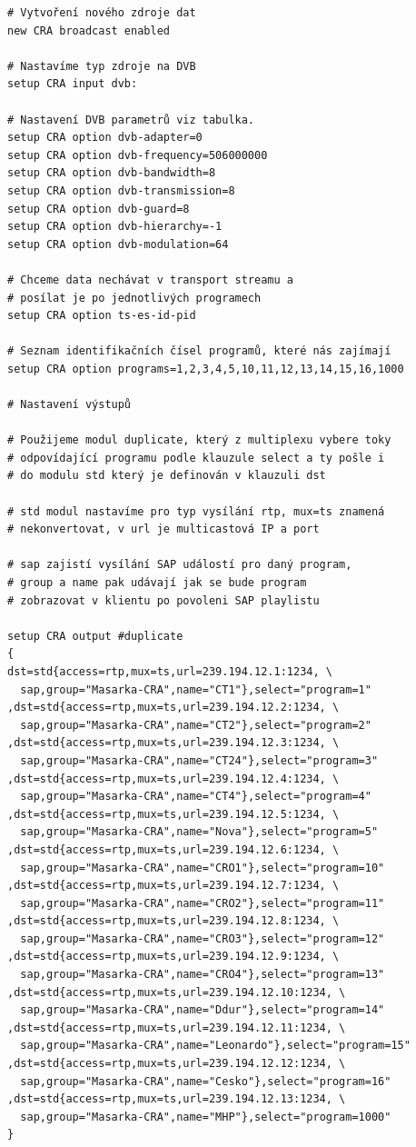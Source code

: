 \begin{small}
\begin{verbatim}
# Vytvoření nového zdroje dat
new CRA broadcast enabled

# Nastavíme typ zdroje na DVB
setup CRA input dvb:

# Nastavení DVB parametrů viz tabulka.
setup CRA option dvb-adapter=0
setup CRA option dvb-frequency=506000000
setup CRA option dvb-bandwidth=8
setup CRA option dvb-transmission=8
setup CRA option dvb-guard=8
setup CRA option dvb-hierarchy=-1
setup CRA option dvb-modulation=64

# Chceme data nechávat v transport streamu a 
# posílat je po jednotlivých programech
setup CRA option ts-es-id-pid

# Seznam identifikačních čísel programů, které nás zajímají
setup CRA option programs=1,2,3,4,5,10,11,12,13,14,15,16,1000

# Nastavení výstupů

# Použijeme modul duplicate, který z multiplexu vybere toky
# odpovídající programu podle klauzule select a ty pošle i
# do modulu std který je definován v klauzuli dst

# std modul nastavíme pro typ vysílání rtp, mux=ts znamená
# nekonvertovat, v url je multicastová IP a port

# sap zajistí vysílání SAP událostí pro daný program,
# group a name pak udávají jak se bude program
# zobrazovat v klientu po povoleni SAP playlistu

setup CRA output #duplicate
{
dst=std{access=rtp,mux=ts,url=239.194.12.1:1234, \
  sap,group="Masarka-CRA",name="CT1"},select="program=1"
,dst=std{access=rtp,mux=ts,url=239.194.12.2:1234, \
  sap,group="Masarka-CRA",name="CT2"},select="program=2"
,dst=std{access=rtp,mux=ts,url=239.194.12.3:1234, \ 
  sap,group="Masarka-CRA",name="CT24"},select="program=3"
,dst=std{access=rtp,mux=ts,url=239.194.12.4:1234, \
  sap,group="Masarka-CRA",name="CT4"},select="program=4"
,dst=std{access=rtp,mux=ts,url=239.194.12.5:1234, \
  sap,group="Masarka-CRA",name="Nova"},select="program=5"
,dst=std{access=rtp,mux=ts,url=239.194.12.6:1234, \
  sap,group="Masarka-CRA",name="CRO1"},select="program=10"
,dst=std{access=rtp,mux=ts,url=239.194.12.7:1234, \
  sap,group="Masarka-CRA",name="CRO2"},select="program=11"
,dst=std{access=rtp,mux=ts,url=239.194.12.8:1234, \
  sap,group="Masarka-CRA",name="CRO3"},select="program=12"
,dst=std{access=rtp,mux=ts,url=239.194.12.9:1234, \
  sap,group="Masarka-CRA",name="CRO4"},select="program=13"
,dst=std{access=rtp,mux=ts,url=239.194.12.10:1234, \
  sap,group="Masarka-CRA",name="Ddur"},select="program=14"
,dst=std{access=rtp,mux=ts,url=239.194.12.11:1234, \
  sap,group="Masarka-CRA",name="Leonardo"},select="program=15"
,dst=std{access=rtp,mux=ts,url=239.194.12.12:1234, \
  sap,group="Masarka-CRA",name="Cesko"},select="program=16"
,dst=std{access=rtp,mux=ts,url=239.194.12.13:1234, \
  sap,group="Masarka-CRA",name="MHP"},select="program=1000"
}
\end{verbatim}
\end{small}

